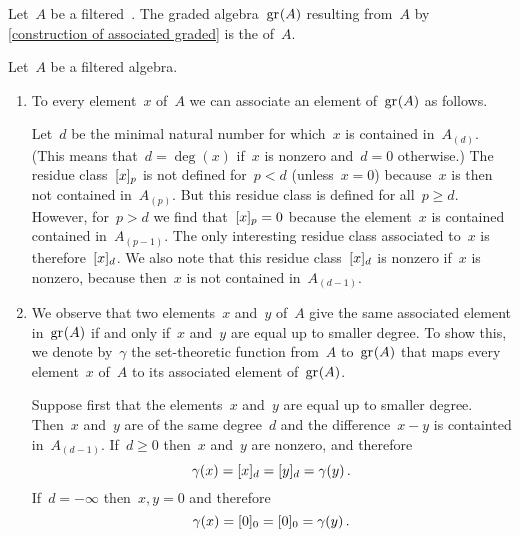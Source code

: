 \begin{definition}
	Let~$A$ be a filtered~\algebra{$\kf$}.
	The graded algebra~$\gr(A)$ resulting from~$A$ by \cref{construction of associated graded} is the  of~$A$.
\end{definition}


\begin{fluff}
	\label{construction of canonical map from filtered to graded}
	Let~$A$ be a filtered algebra.
	\begin{enumerate}
		\item
			To every element~$x$ of~$A$ we can associate an element of~$\gr(A)$ as follows.

			Let~$d$ be the minimal natural number for which~$x$ is contained in~$A_{(d)}$.
			(This means that~$d = \deg(x)$ if~$x$ is nonzero and~$d = 0$ otherwise.)
			The residue class~$\lbrack x\rbrack_p$ is not defined for~$p < d$ (unless~$x = 0$) because~$x$ is then not contained in~$A_{(p)}$.
			But this residue class is defined for all~$p \geq d$.
			However, for~$p > d$ we find that~$\lbrack x\rbrack_p = 0$ because the element~$x$ is contained contained in~$A_{(p-1)}$.
			The only interesting residue class associated to~$x$ is therefore~$\lbrack x\rbrack_d$.
			We also note that this residue class~$\lbrack x\rbrack_d$ is nonzero if~$x$ is nonzero, because then~$x$ is not contained in~$A_{(d-1)}$.
		\item
			We observe that two elements~$x$ and~$y$ of~$A$ give the same associated element in~$\gr(A)$ if and only if~$x$ and~$y$ are equal up to smaller degree.
			To show this, we denote by~$\gamma$ the set-theoretic function from~$A$ to~$\gr(A)$ that maps every element~$x$ of~$A$ to its associated element of~$\gr(A)$.
			
			Suppose first that the elements~$x$ and~$y$ are equal up to smaller degree.
			Then~$x$ and~$y$ are of the same degree~$d$ and the difference~$x - y$ is containted in~$A_{(d-1)}$.
			If~$d \geq 0$ then~$x$ and~$y$ are nonzero, and therefore
			\[
				\gamma(x)
				=
				\lbrack x\rbrack_d
				=
				\lbrack y\rbrack_d
				=
				\gamma(y) \,.
			\]
			If~$d = -\infty$ then~$x, y = 0$ and therefore
			\[
				\gamma(x) = \lbrack0\rbrack_0 = \lbrack0\rbrack_0 = \gamma(y) \,.
			\]
			

\end{enumerate}
\end{fluff}
